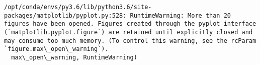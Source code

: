 \documentclass[11pt]{article}
\begin{document}
    \begin{Verbatim}[commandchars=\\\{\}]
/opt/conda/envs/py3.6/lib/python3.6/site-packages/matplotlib/pyplot.py:528: RuntimeWarning: More than 20 figures have been opened. Figures created through the pyplot interface (`matplotlib.pyplot.figure`) are retained until explicitly closed and may consume too much memory. (To control this warning, see the rcParam `figure.max\_open\_warning`).
  max\_open\_warning, RuntimeWarning)

    \end{Verbatim}

    \begin{center}
    \end{center}
    { \hspace*{\fill} \\}
    
    \begin{center}
    \end{center}
    { \hspace*{\fill} \\}
    
    \begin{center}
    \end{center}
    { \hspace*{\fill} \\}
    
    \begin{center}
    \end{center}
    { \hspace*{\fill} \\}
    
    \begin{center}
    \end{center}
    { \hspace*{\fill} \\}
    
    \begin{center}
    \end{center}
    { \hspace*{\fill} \\}
    
\end{document}

